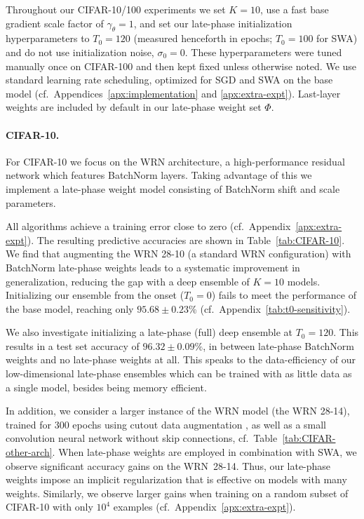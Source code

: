 \documentclass{article} \usepackage{iclr2021_conference,times}
\begin{document}
Throughout our CIFAR-10/100 experiments we set $K=10$, use a fast base gradient scale factor of $\gamma_\theta=1$, and set our late-phase initialization hyperparameters to $T_0=120$ (measured henceforth in epochs; $T_0=100$ for SWA) and do not use initialization noise, $\sigma_0=0$. These hyperparameters were tuned manually once on CIFAR-100 and then kept fixed unless otherwise noted. We use standard learning rate scheduling, optimized for SGD and SWA on the base model (cf.~Appendices~\ref{apx:implementation} and \ref{apx:extra-expt}). Last-layer weights are included by default in our late-phase weight set $\Phi$.


\paragraph{CIFAR-10.} For CIFAR-10 we focus on the WRN architecture, a high-performance residual network \citep[WRN;][]{zagoruyko_wide_2016} which features BatchNorm layers. Taking advantage of this we implement a late-phase weight model consisting of BatchNorm shift and scale parameters.

All algorithms achieve a training error close to zero (cf.~Appendix~\ref{apx:extra-expt}). The resulting predictive accuracies are shown in Table~\ref{tab:CIFAR-10}. We find that augmenting the WRN 28-10 (a standard WRN configuration) with BatchNorm late-phase weights leads to a systematic improvement in generalization, reducing the gap with a deep ensemble of $K=10$ models. Initializing our ensemble from the onset ($T_0=0$) fails to meet the performance of the base model, reaching only $95.68 \pm 0.23$\% (cf.~Appendix~\ref{tab:t0-sensitivity}).

We also investigate initializing a late-phase (full) deep ensemble at $T_0=120$. This results in a test set accuracy of $96.32 \pm 0.09 \%$, in between late-phase BatchNorm weights and no late-phase weights at all. This speaks to the data-efficiency of our low-dimensional late-phase ensembles which can be trained with as little data as a single model, besides being memory efficient.



In addition, we consider a larger instance of the WRN model (the WRN 28-14), trained for 300 epochs using cutout data augmentation \citep[][]{devries_improved_2017}, as well as a small convolution neural network without skip connections, cf.~Table~\ref{tab:CIFAR-other-arch}. When late-phase weights are employed in combination with SWA, we observe significant accuracy gains on the WRN~28-14. Thus, our late-phase weights impose an implicit regularization that is effective on models with many weights. Similarly, we observe larger gains when training on a random subset of CIFAR-10 with only $10^4$ examples (cf.~Appendix~\ref{apx:extra-expt}).
\end{document}
